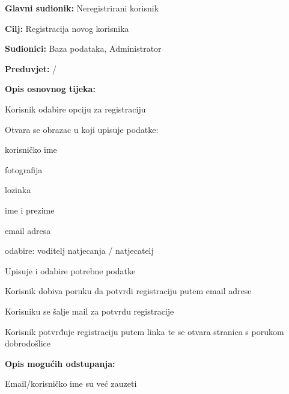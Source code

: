 						\noindent {}
					\begin{packed_item}
						
						\item \textbf{Glavni sudionik: } Neregistrirani korisnik
						\item  \textbf{Cilj:} Registracija novog korisnika
						\item  \textbf{Sudionici:} Baza podataka, Administrator
						\item  \textbf{Preduvjet:}  / 
						\item  \textbf{Opis osnovnog tijeka:}
						
						\item[] \begin{packed_enum}
							\item Korisnik odabire opciju za registraciju
							\item Otvara se obrazac u koji upisuje podatke:
							\item[] \begin{packed_enum}
								
								\item korisničko ime
								\item fotografija
								\item lozinka
								\item ime i prezime
								\item email adresa
								\item odabire: voditelj natjecanja / natjecatelj
								
							\end{packed_enum}
							\item Upisuje i odabire potrebne podatke		
							\item Korisnik dobiva poruku da potvrdi registraciju putem email adrese	
							\item Korisniku se šalje mail za potvrdu registracije
							\item Korisnik potvrđuje registraciju putem linka te se otvara stranica s porukom dobrodošlice
						\end{packed_enum}
						
						\item  \textbf{Opis mogućih odstupanja:}
						
						\item[] \begin{packed_item}
							
							\item[2.a]Email/korisničko ime su već zauzeti
							\item[] \begin{packed_enum}
								

\end{packed_enum}
\end{packed_item}
\end{packed_item}
